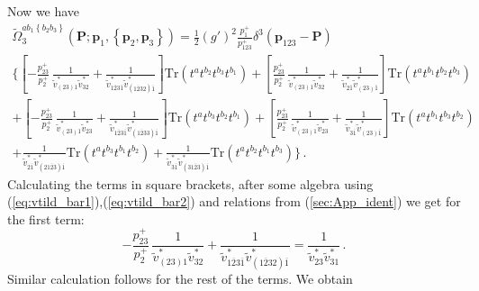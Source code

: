 \documentclass[english,american]{article}
\begin{document}
Now we have
\begin{multline}
\tilde{\Omega}_{3}^{ab_{1}\left\{ b_{2}b_{3}\right\} }\left(\mathbf{P};\mathbf{p}_{1},\left\{ \mathbf{p}_{2},\mathbf{p}_{3}\right\} \right)=\frac{1}{2}\left(g'\right)^{2}\frac{p_{1}^{+}}{p_{123}^{+}}\delta^{3}\left(\mathbf{p}_{123}-\mathbf{P}\right)\\
\Bigg\{\left[-\frac{p_{23}^{+}}{p_{2}^{+}}\,\frac{1}{\tilde{v}_{\left(23\right)1}^{*}\tilde{v}_{32}^{*}}+\frac{1}{\tilde{v}_{\overline{123}\overline{1}}^{*}\tilde{v}_{\left(\overline{123}2\right)\overline{1}}^{*}}\right]\mathrm{Tr}\left(t^{a}t^{b_{2}}t^{b_{3}}t^{b_{1}}\right)+\left[\frac{p_{23}^{+}}{p_{2}^{+}}\,\frac{1}{\tilde{v}_{\left(23\right)1}^{*}\tilde{v}_{32}^{*}}+\frac{1}{\tilde{v}_{2\overline{1}}^{*}\tilde{v}_{\left(23\right)\overline{1}}^{*}}\right]\mathrm{Tr}\left(t^{a}t^{b_{1}}t^{b_{2}}t^{b_{3}}\right)\\
+\left[-\frac{p_{23}^{+}}{p_{2}^{+}}\,\frac{1}{\tilde{v}_{\left(23\right)1}^{*}\tilde{v}_{23}^{*}}+\frac{1}{\tilde{v}_{\overline{123}\overline{1}}^{*}\tilde{v}_{\left(\overline{123}3\right)\overline{1}}^{*}}\right]\mathrm{Tr}\left(t^{a}t^{b_{3}}t^{b_{2}}t^{b_{1}}\right)+\left[\frac{p_{23}^{+}}{p_{2}^{+}}\,\frac{1}{\tilde{v}_{\left(23\right)1}^{*}\tilde{v}_{23}^{*}}+\frac{1}{\tilde{v}_{3\overline{1}}^{*}\tilde{v}_{\left(23\right)\overline{1}}^{*}}\right]\mathrm{Tr}\left(t^{a}t^{b_{1}}t^{b_{3}}t^{b_{2}}\right)\\
+\frac{1}{\tilde{v}_{2\overline{1}}^{*}\tilde{v}_{\left(2\overline{123}\right)\overline{1}}^{*}}\mathrm{Tr}\left(t^{a}t^{b_{3}}t^{b_{1}}t^{b_{2}}\right)+\frac{1}{\tilde{v}_{3\overline{1}}^{*}\tilde{v}_{\left(3\overline{123}\right)\overline{1}}^{*}}\mathrm{Tr}\left(t^{a}t^{b_{2}}t^{b_{1}}t^{b_{3}}\right)\Bigg\}\,.
\end{multline}
Calculating the terms in square brackets, after some algebra using
(\ref{eq:vtild_bar1}),(\ref{eq:vtild_bar2}) and relations from (\ref{sec:App_ident})
we get for the first term:
\begin{equation}
-\frac{p_{23}^{+}}{p_{2}^{+}}\,\frac{1}{\tilde{v}_{\left(23\right)1}^{*}\tilde{v}_{32}^{*}}+\frac{1}{\tilde{v}_{\overline{123}\overline{1}}^{*}\tilde{v}_{\left(\overline{123}2\right)\overline{1}}^{*}}=\frac{1}{\tilde{v}_{23}^{*}\tilde{v}_{31}^{*}}\,.
\end{equation}
Similar calculation follows for the rest of the terms. We obtain
\end{document}
